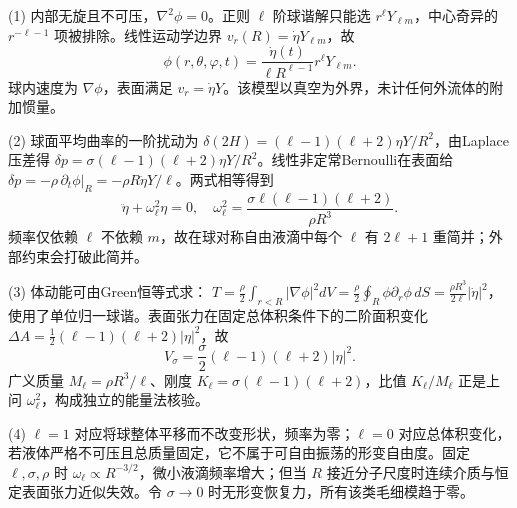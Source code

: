 (1) 内部无旋且不可压，\(\nabla^2\phi=0\)。正则 \(\ell\) 阶球谐解只能选 \(r^\ell Y_{\ell m}\)，中心奇异的 \(r^{-\ell-1}\) 项被排除。线性运动学边界 \(v_r(R)=\dot\eta Y_{\ell m}\)，故
\[
\boxed{\phi(r,\theta,\varphi,t)=\frac{\dot\eta(t)}{\ell R^{\ell-1}}r^\ell Y_{\ell m}}.
\]
球内速度为 \(\nabla\phi\)，表面满足 \(v_r=\dot\eta Y\)。该模型以真空为外界，未计任何外流体的附加惯量。

(2) 球面平均曲率的一阶扰动为 \(\delta(2H)=(\ell-1)(\ell+2)\eta Y/R^2\)，由Laplace压差得 \(\delta p=\sigma(\ell-1)(\ell+2)\eta Y/R^2\)。线性非定常Bernoulli在表面给 \(\delta p=-\rho\,\partial_t\phi|_R=-\rho R\ddot\eta Y/\ell\)。两式相等得到
\[
\boxed{\ddot\eta+\omega_\ell^2\eta=0,\quad
\omega_\ell^2=\frac{\sigma\ell(\ell-1)(\ell+2)}{\rho R^3}}.
\]
频率仅依赖 \(\ell\) 不依赖 \(m\)，故在球对称自由液滴中每个 \(\ell\) 有 \(2\ell+1\) 重简并；外部约束会打破此简并。

(3) 体动能可由Green恒等式求：
\(T=\frac\rho2\int_{r<R}|\nabla\phi|^2dV=\frac\rho2\oint_R\phi\partial_r\phi\,dS
=\frac{\rho R^3}{2\ell}|\dot\eta|^2\)，使用了单位归一球谐。表面张力在固定总体积条件下的二阶面积变化
\(\Delta A=\frac12(\ell-1)(\ell+2)|\eta|^2\)，故
\[
V_\sigma=\frac{\sigma}{2}(\ell-1)(\ell+2)|\eta|^2.
\]
广义质量 \(M_\ell=\rho R^3/\ell\)、刚度 \(K_\ell=\sigma(\ell-1)(\ell+2)\)，比值 \(K_\ell/M_\ell\) 正是上问 \(\omega_\ell^2\)，构成独立的能量法核验。

(4) \(\ell=1\) 对应将球整体平移而不改变形状，频率为零；\(\ell=0\) 对应总体积变化，若液体严格不可压且总质量固定，它不属于可自由振荡的形变自由度。固定 \(\ell,\sigma,\rho\) 时 \(\omega_\ell\propto R^{-3/2}\)，微小液滴频率增大；但当 \(R\) 接近分子尺度时连续介质与恒定表面张力近似失效。令 \(\sigma\to0\) 时无形变恢复力，所有该类毛细模趋于零。
